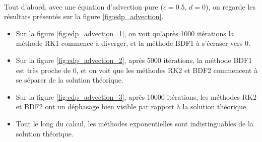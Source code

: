     \paragraph{}
    Tout d'abord, avec une équation d'advection pure ($c = 0.5$, $d = 0$), on regarde les résultats présentés sur la figure \ref{fig:edp_advection}.
    \begin{itemize}
        \item Sur la figure \ref{fig:edp_advection_1}, on voit qu'après 1000 itérations la méthode RK1 commence à diverger, et la méthode BDF1 à s'écraser vers 0.
        \item Sur la figure \ref{fig:edp_advection_2}, après 5000 itérations, la méthode BDF1 est très proche de 0, et on voit que les méthodes RK2 et BDF2 commencent à se séparer de la solution théorique.
        \item Sur la figure \ref{fig:edp_advection_3}, après 10000 itérations, les méthodes RK2 et BDF2 ont un déphasage bien visible par rapport à la solution théorique.
        \item Tout le long du calcul, les méthodes exponentielles sont indistinguables de la solution théorique.
    \end{itemize}
